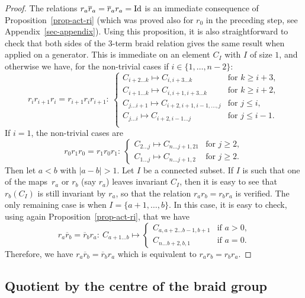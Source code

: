 \documentclass[pdftex]{sigma}
\numberwithin{equation}{section}
\theoremstyle{definition}
\newcommand{\rb}{\overline{r}}
\begin{document}
\begin{proof}
The relations $r_a\rb_a=\rb_ar_a={\rm Id}$ is an immediate consequence of Proposition~\ref{prop-act-ri} (which was proved also for $r_0$ in the preceding step, see Appendix~\ref{sec-appendix}). Using this proposition, it is also straightforward to check that both sides of the 3-term braid relation gives the same result when applied on a generator. This is immediate on an element $C_I$ with $I$ of size $1$, and otherwise we have, for the non-trivial cases if $i\in\{1,\dots,n-2\}$:
\[r_ir_{i+1}r_i=r_{i+1}r_ir_{i+1}\colon \ \begin{cases}
C_{i+2\dots k} \mapsto C_{i,i+3\dots k} & \text{for }k\geq i+3 , \\
C_{i+1\dots k} \mapsto C_{i,i+1,i+3\dots k} & \text{for }k\geq i+2 , \\
C_{j\dots i+1} \mapsto C_{i+2,i+1,i-1,\dots,j} & \text{for }j\leq i ,\\
C_{j\dots i} \mapsto C_{i+2,i-1\dots j} & \text{for }j\leq i-1 .\\
\end{cases}\]
If $i=1$, the non-trivial cases are
\[r_0r_{1}r_0=r_{1}r_0r_{1}\colon \ \begin{cases}
C_{2\dots j} \mapsto C_{n \dots j+1, 21} & \text{for }j\geq 2 , \\
C_{1\dots j} \mapsto C_{n\dots j+1,2} & \text{for }j\geq 2 .
\end{cases}\]
Then let $a<b$ with $|a-b|>1$. Let $I$ be a connected subset. If $I$ is such that one of the maps~$r_a$ or $r_b$ (say $r_a$) leaves invariant $C_I$, then it is easy to see that $r_b(C_I)$ is still invariant by $r_a$, so that the relation $r_ar_b=r_br_a$ is verified. The only remaining case is when $I=\{a+1,\dots,b\}$. In this case, it is easy to check, using again Proposition~\ref{prop-act-ri}, that we have
\[r_a\rb_b=\rb_br_a\colon \ C_{a+1\dots b}\mapsto \begin{cases} C_{a,a+2\dots b-1,b+1} & \text{if $a>0$,}\\
C_{n\dots b+2, b, 1} & \text{if $a=0$.}
\end{cases}\]
Therefore, we have $r_a\rb_b=\rb_br_a$ which is equivalent to $r_ar_b=r_br_a$.
\end{proof}

\subsection{Quotient by the centre of the braid group}
\end{document}
